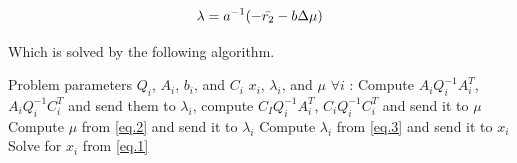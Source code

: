 \begin{equation}{\label{eq.3}}
     \lambda = a^{-1} (- \Bar{r_2} - b \Delta \mu)
\end{equation}

Which is solved by the following algorithm. 

\begin{algorithm}
    \caption{Basic distributed algorithm for linear quadratic problem}
  \begin{algorithmic}[1]
    \INPUT Problem parameters $Q_i$, $A_i$, $b_i$, and $C_i$
    \OUTPUT $x_i$, $\lambda_i$, and $\mu$
      \STATE $\forall i$ : Compute $A_i Q_{i}^{-1}A_{i}^{T}$, $A_i Q_{i}^{-1}C_{i}^{T}$ and send them to $\lambda_i$, compute $C_I Q_{i}^{-1}A_{i}^{T}$, $C_i Q_{i}^{-1}C_{i}^{T}$ and send it to $\mu$
      \STATE Compute $\mu$ from \ref{eq.2} and send it to $\lambda_i$
      \STATE Compute $\lambda_i$ from \ref{eq.3} and send it to $x_i$
      \STATE Solve for $x_i$ from \ref{eq.1}
  \end{algorithmic}
\end{algorithm}